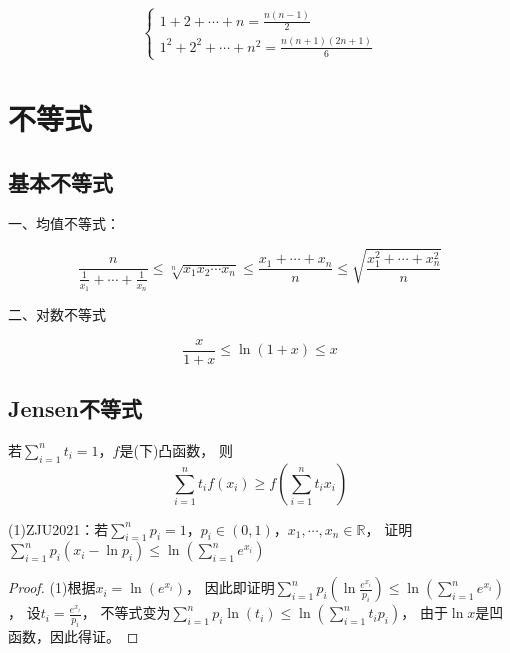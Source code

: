 \begin{equation*}
  \begin{cases}
    1 + 2 + \cdots + n = \frac{n(n-1)}{2}\\
    1^2 + 2^2 + \cdots + n^2 = \frac{n(n+1)(2n+1)}{6}
  \end{cases}
\end{equation*}


\section{不等式}

\subsection{基本不等式}

\noindent 一、均值不等式：

\begin{equation*}
  \frac{n}{\frac{1}{x_1} + \cdots + \frac{1}{x_n}} \leq \sqrt[n]{x_1x_2\cdots x_n} \leq \frac{x_1 + \cdots + x_n}{n} \leq \sqrt{\frac{x_1^2 + \cdots + x_n^2}{n}}
\end{equation*}

\noindent 二、对数不等式

\begin{equation*}
  \frac{x}{1+x} \leq \ln(1 + x) \leq x
\end{equation*}


\subsection{Jensen不等式}

\begin{theorem}[Jensen不等式]
  若$\sum\limits_{i = 1}^n t_i = 1$，$f$是(下)凸函数，
  则
  \begin{equation*}
    \sum\limits_{i = 1}^n t_if(x_i) \geq f(\sum\limits_{i = 1}^n t_ix_i)
  \end{equation*}
\end{theorem}

\begin{exercise}[Jensen不等式的应用]
  (1)ZJU2021：若$\sum\limits_{i = 1}^n p_i = 1$，$p_i \in (0,1)$，$x_1,\cdots,x_n \in \mathbb{R}$，
  证明$\sum\limits_{i = 1}^n p_i(x_i - \ln p_i) \leq \ln (\sum\limits_{i = 1}^n e^{x_i})$
\end{exercise}

\begin{proof}
  (1)根据$x_i = \ln(e^{x_i})$，
  因此即证明$\sum\limits_{i = 1}^n p_i(\ln \frac{e^{x_i}}{p_i}) \leq \ln(\sum\limits_{i = 1}^n e^{x_i})$，
  设$t_i = \frac{e^{x_i}}{p_i}$，
  不等式变为$\sum\limits_{i = 1}^n p_i \ln(t_i) \leq \ln(\sum\limits_{i = 1}^n t_ip_i)$，
  由于$\ln x$是凹函数，因此得证。
\end{proof}

